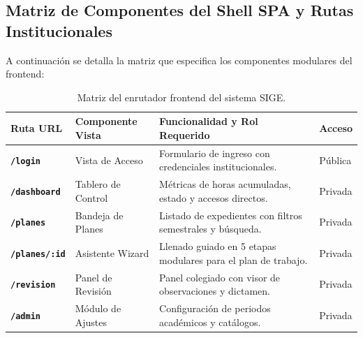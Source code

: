 \documentclass[12pt,a4paper]{article}
\begin{document}
\subsection{Matriz de Componentes del Shell SPA y Rutas Institucionales}
A continuación se detalla la matriz que especifica los componentes modulares del frontend:
\begin{table}[H]
\centering
\small
\renewcommand{\arraystretch}{1.2}
\begin{tabularx}{\textwidth}{|>{\hsize=0.6\hsize\centering\arraybackslash\bfseries\footnotesize}X|>{\hsize=1.1\hsize\raggedright\arraybackslash\footnotesize}X|>{\hsize=1.6\hsize\raggedright\arraybackslash\footnotesize}X|>{\hsize=0.7\hsize\centering\arraybackslash\footnotesize}X|}
\hline
\rowcolor{tableheader}
\textbf{Ruta URL} & \textbf{Componente Vista} & \textbf{Funcionalidad y Rol Requerido} & \textbf{Acceso} \\
\hline
\texttt{/\allowbreak  login} & Vista de Acceso & Formulario de ingreso con credenciales institucionales. & Pública \\
\hline
\texttt{/\allowbreak  dashboard} & Tablero de Control & Métricas de horas acumuladas, estado y accesos directos. & Privada \\
\hline
\texttt{/\allowbreak  planes} & Bandeja de Planes & Listado de expedientes con filtros semestrales y búsqueda. & Privada \\
\hline
\texttt{/\allowbreak  planes/\allowbreak  :id} & Asistente Wizard & Llenado guiado en 5 etapas modulares para el plan de trabajo. & Privada \\
\hline
\texttt{/\allowbreak  revision} & Panel de Revisión & Panel colegiado con visor de observaciones y dictamen. & Privada \\
\hline
\texttt{/\allowbreak  admin} & Módulo de Ajustes & Configuración de periodos académicos y catálogos. & Privada \\
\hline
\end{tabularx}
\caption{Matriz del enrutador frontend del sistema SIGE.}
\label{tab:router_matrix}
\end{table}
\end{document}
